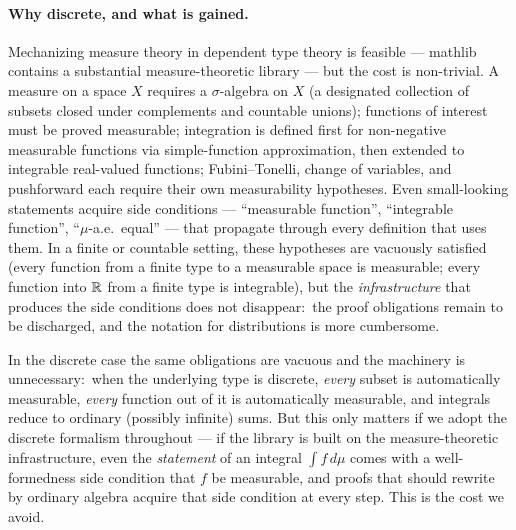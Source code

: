 \paragraph{Why discrete, and what is gained.}  Mechanizing
measure theory in dependent type theory is feasible — mathlib
contains a substantial measure-theoretic library — but the cost is
non-trivial.  A measure on a space $X$ requires a $\sigma$-algebra
on $X$ (a designated collection of subsets closed under
complements and countable unions); functions of interest must be
proved measurable; integration is defined first for
non-negative measurable functions via simple-function
approximation, then extended to integrable real-valued functions;
Fubini–Tonelli, change of variables, and pushforward each require
their own measurability hypotheses.  Even small-looking statements
acquire side conditions — ``measurable function'', ``integrable
function'', ``$\mu$-a.e.\ equal'' — that propagate through every
definition that uses them.  In a finite or countable setting,
these hypotheses are vacuously satisfied (every function from a
finite type to a measurable space is measurable; every function
into $\mathbb{R}$ from a finite type is integrable), but the
\emph{infrastructure} that produces the side conditions does not
disappear:\ the proof obligations remain to be discharged, and the
notation for distributions is more cumbersome.

In the discrete case the same obligations are vacuous and the
machinery is unnecessary:\ when the underlying type is discrete,
\emph{every} subset is automatically measurable, \emph{every}
function out of it is automatically measurable, and integrals
reduce to ordinary (possibly infinite) sums.  But this only
matters if we adopt the discrete formalism throughout — if the
library is built on the measure-theoretic infrastructure, even
the \emph{statement} of an integral $\int f \, d\mu$ comes with a
well-formedness side condition that $f$ be measurable, and proofs
that should rewrite by ordinary algebra acquire that side
condition at every step.  This is the cost we avoid.

